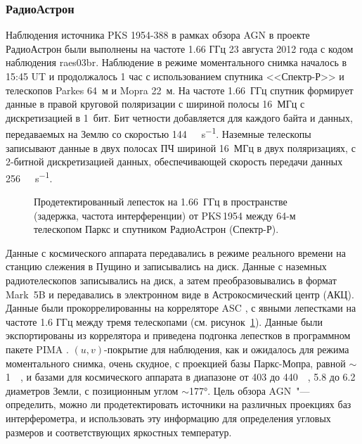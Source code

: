 \subsubsection{РадиоАстрон}

Наблюдения источника PKS 1954-388 в рамках обзора AGN в проекте РадиоАстрон были выполнены на
частоте 1.66 ГГц 23 августа 2012 года с кодом наблюдения raes03br. Наблюдение в режиме моментального
снимка началось в 15:45 UT и продолжалось 1 час с использованием спутника <<Спектр-Р>> и телескопов
Parkes 64~м и Mopra 22~м. На частоте 1.66~ГГц спутник формирует данные в правой круговой поляризации
с шириной полосы 16~МГц с дискретизацией в 1~бит. Бит четности добавляется для каждого байта и
данных, передаваемых на Землю со скоростью \SI{144}{\mega\bit\per\second}. Наземные телескопы
записывают данные в двух полосах ПЧ шириной 16~МГц в двух поляризациях, с 2-битной дискретизацией
данных, обеспечивающей скорость передачи данных \SI{256}{\mega\bit\per\second}.

\begin{figure}[]
\caption{Продетектированный лепесток на 1.66~ГГц в пространстве (задержка, частота интерференции)
от PKS\,1954 между 64-м телескопом Паркс и спутником РадиоАстрон (Спектр-Р).}
\label{fig:pks_1954_fringe}
\end{figure}

Данные с космического аппарата передавались в режиме реального времени на станцию слежения в
Пущино и записывались на диск. Данные с наземных радиотелескопов записывались на диск, а затем
преобразовывались в формат Mark~5B и передавались в электронном виде в Астрокосмический
центр (АКЦ). Данные были прокоррелированны на корреляторе ASC \cite{Kardashev_2013_rus}, с явными
лепестками на частоте 1.6 ГГц между тремя телескопами (см. рисунок~\ref{fig:pks_1954_fringe}).
Данные были экспортированы из коррелятора и приведена подгонка лепестков в программном пакете PIMA
\cite{Petrov_2011}. $(u, v)$-покрытие для наблюдения, как и ожидалось для режима моментального
снимка, очень скудное, с проекцией базы Паркс-Мопра, равной $\sim$\SI{1}{\mega\la}, и базами для
космического аппарата в диапазоне от 403 до \SI{440}{\mega\la}, 5.8 до 6.2 диаметров Земли, с
позиционным углом $\sim$\ang{177}. Цель обзора AGN~"--- определить, можно ли продетектировать
источники на различных проекциях баз интерферометра, и использовать эту информацию для определения
угловых размеров и соответствующих яркостных температур.

